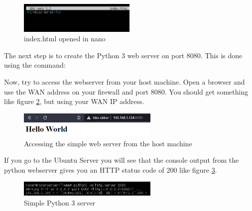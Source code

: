 \begin{figure}[h!]
    \centering
    \includegraphics[width=0.5\textwidth]{Images/nat/index.PNG}
    \caption{index.html opened in nano}
    \label{opnsense:nat_index}
\end{figure}

The next step is to create the Python 3 web server on port 8080. This is done using the command:


Now, try to access the webserver from your host machine. Open a browser and use the WAN address on your firewall and port 8080. You should get something like figure \ref{opnsense:nat_python_client}, but using your WAN IP address.

\begin{figure}[h!]
    \centering
    \includegraphics[width=0.6\textwidth]{Images/nat/client_browser.PNG}
    \caption{Accessing the simple web server from the host machine}
    \label{opnsense:nat_python_client}
\end{figure}

If you go to the Ubuntu Server you will see that the console output from the python webserver gives you an HTTP status code of 200 like figure \ref{opnsense:nat_python}.

\begin{figure}[h!]
    \centering
    \includegraphics[width=0.6\textwidth]{Images/nat/python_server.PNG}
    \caption{Simple Python 3 server}
    \label{opnsense:nat_python}
\end{figure}


